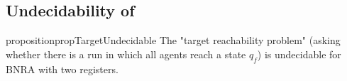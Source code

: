 \subsection{Undecidability of \Target}
\label{sec:undec-target}

\begin{restatable}{proposition}{propTargetUndecidable}
\label{prop:target-undec}
	The "target reachability problem" (asking whether there is a run in which all agents reach a state $q_f$) is undecidable for BNRA with two registers.
\end{restatable}
